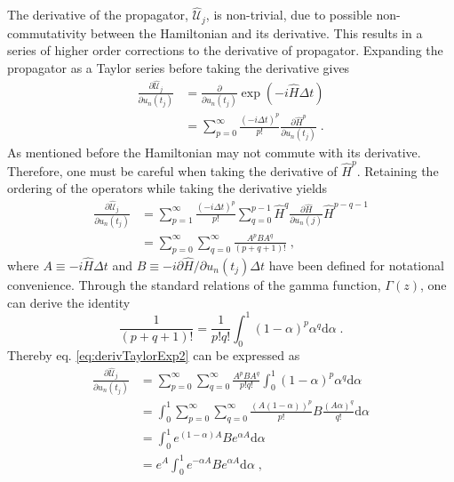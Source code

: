 The derivative of the propagator, $\hat{\mathcal{U}}_{j}$, is non-trivial, due to possible non-commutativity between the Hamiltonian and its derivative. This results in a series of higher order corrections to the derivative of propagator.
Expanding the propagator as a Taylor series before taking the derivative gives
\begin{align}
	\frac{\partial \hat{\mathcal{U}}_{j}}{\partial u_n (t_j)} &= \frac{\partial}{\partial u_n (t_j)}  \exp \left( -i \hat{H} \Delta t \right) \nonumber \\
	&= \sum_{p = 0}^{\infty} \frac{( -i \Delta t  )^p}{p!} \frac{\partial \hat{H}^p}{\partial u_n (t_j)} \; .  
	\label{eq:derivTaylorExp}
\end{align}
As mentioned before the Hamiltonian may not commute with its derivative. Therefore, one must be careful when taking the derivative of $\hat{H}^p$. Retaining the ordering of the operators while taking the derivative yields
\begin{align}
	\frac{\partial \hat{\mathcal{U}}_{j}}{\partial u_n (t_j)} &= \sum_{p=1}^{\infty} \frac{ \left( -i \Delta t \right) ^p }{p!} \sum_{q=0}^{p-1} \hat{H}^q \frac{\partial \hat{H}}{\partial u_n (j)} \hat{H}^{p-q-1} \nonumber \\
	&= \sum_{p=0}^{\infty} \sum_{q=0}^{\infty} \frac{A^p B A^q}{(p+q+1)!} \; , \label{eq:derivTaylorExp2}
\end{align} 
where $A \equiv -i \hat{H} \Delta t$ and $B \equiv -i \partial \hat{H}/\partial u_n (t_j) \Delta t$ have been defined for notational convenience. Through the standard relations of the gamma function, $\Gamma (z)$, one can derive the identity
\begin{equation}
	\frac{1}{(p+q+1)!} = \frac{1}{p! q !} \int_{0}^{1} (1-\alpha)^p \alpha^q \mathrm{d}\alpha \; .
\end{equation}
Thereby eq. \eqref{eq:derivTaylorExp2} can be expressed as
\begin{align}
	\frac{\partial \hat{\mathcal{U}}_{j}}{\partial u_n (t_j)} &= \sum_{p=0}^{\infty} \sum_{q=0}^{\infty} \frac{A^p B A^q}{p! q !}  \int_{0}^{1} (1-\alpha)^p \alpha^q \mathrm{d}\alpha \nonumber \\
	&= \int_{0}^{1} \sum_{p=0}^{\infty} \sum_{q=0}^{\infty} \frac{(A (1- \alpha))^p}{p!} B \frac{(A \alpha)^q}{q!}  \mathrm{d}\alpha \nonumber \\
	&= \int_{0}^{1} e^{ (1- \alpha) A} B e^{ \alpha A} \mathrm{d}\alpha \nonumber \\
	 &= e^A \int_{0}^{1} e^{ - \alpha A} B e^{ \alpha A} \mathrm{d}\alpha \; , \label{eq:eq:derivTaylorExp3}
\end{align}
